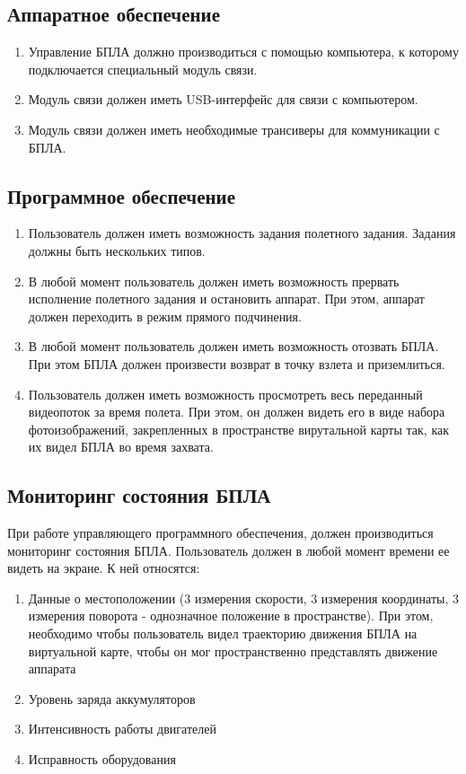 \documentclass[utf8]{report}
\begin{document}
\subsection{Аппаратное обеспечение}
\begin{enumerate}
  \item Управление БПЛА должно производиться с помощью компьютера, к которому подключается специальный модуль связи.
  \item Модуль связи должен иметь USB-интерфейс для связи с компьютером.
  \item Модуль связи должен иметь необходимые трансиверы для коммуникации с БПЛА.
\end{enumerate}

\subsection{Программное обеспечение}
\begin{enumerate}
  \item Пользователь должен иметь возможность задания полетного задания. Задания должны быть нескольких типов.
  \item В любой момент пользователь должен иметь возможность прервать исполнение полетного задания и остановить аппарат. При этом, аппарат должен переходить в режим прямого подчинения.
  \item В любой момент пользователь должен иметь возможность отозвать БПЛА. При этом БПЛА должен произвести возврат в точку взлета и приземлиться.
  \item Пользователь должен иметь возможность просмотреть весь переданный видеопоток за время полета. При этом, он должен видеть его в виде набора фотоизображений, закрепленных в пространстве вирутальной карты так, как их видел БПЛА во время захвата. 
\end{enumerate}

\subsection{Мониторинг состояния БПЛА}
При работе управляющего программного обеспечения, должен производиться мониторинг состояния БПЛА. Пользователь должен в любой момент времени ее видеть на экране. К ней относятся:
\begin{enumerate}
  \item Данные о местоположении (3 измерения скорости, 3 измерения координаты, 3 измерения поворота - однозначное положение в пространстве). При этом, необходимо чтобы пользователь видел траекторию движения БПЛА на виртуальной карте, чтобы он мог пространственно представлять движение аппарата
  \item Уровень заряда аккумуляторов
  \item Интенсивность работы двигателей
  \item Исправность оборудования
\end{enumerate}
\end{document}
